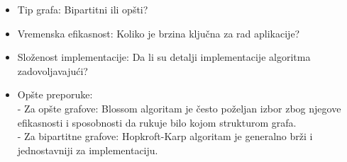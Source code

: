 \documentclass[11pt,a4paper]{article}
\theoremstyle{definition}
\begin{document}
\begin{tcolorbox}[width=393pt,colback={myblue},title={Ključna razmatranja za izbor algoritma},colbacktitle=mygray,coltitle=black,boxrule=0.5pt,boxsep=3pt]  
\begin{itemize}  
\item Tip grafa: Bipartitni ili opšti?
\item Vremenska efikasnost: Koliko je brzina ključna za rad aplikacije? 
\item Složenost implementacije: Da li su detalji implementacije algoritma zadovoljavajući?
\item Opšte preporuke:\\
- Za opšte grafove: Blossom algoritam je često poželjan izbor zbog njegove efikasnosti i sposobnosti da rukuje bilo kojom strukturom grafa.\\
- Za bipartitne grafove: Hopkroft-Karp algoritam je generalno brži i jednostavniji za implementaciju.
\end{itemize}
\end{tcolorbox} 
\newpage
\end{document}

